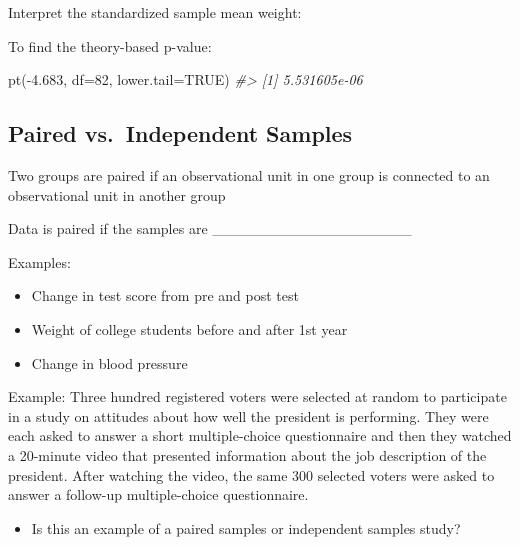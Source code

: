 \documentclass[
]{report}
\newenvironment{Shaded}{\begin{snugshade}}{\end{snugshade}}
\newcommand{\AttributeTok}[1]{\textcolor[rgb]{0.77,0.63,0.00}{#1}}
\newcommand{\CommentTok}[1]{\textcolor[rgb]{0.56,0.35,0.01}{\textit{#1}}}
\newcommand{\ConstantTok}[1]{\textcolor[rgb]{0.00,0.00,0.00}{#1}}
\newcommand{\DecValTok}[1]{\textcolor[rgb]{0.00,0.00,0.81}{#1}}
\newcommand{\FloatTok}[1]{\textcolor[rgb]{0.00,0.00,0.81}{#1}}
\newcommand{\FunctionTok}[1]{\textcolor[rgb]{0.00,0.00,0.00}{#1}}
\newcommand{\NormalTok}[1]{#1}
\newcommand{\SpecialCharTok}[1]{\textcolor[rgb]{0.00,0.00,0.00}{#1}}
\providecommand{\tightlist}{%
  \setlength{\itemsep}{0pt}\setlength{\parskip}{0pt}}
\newcommand{\rgi}{\hspace{24pt}}  %
\begin{document}
Interpret the standardized sample mean weight:

\vspace{0.8in}

To find the theory-based p-value:

\begin{Shaded}
\begin{Highlighting}[]
\FunctionTok{pt}\NormalTok{(}\SpecialCharTok{{-}}\FloatTok{4.683}\NormalTok{, }\AttributeTok{df=}\DecValTok{82}\NormalTok{, }\AttributeTok{lower.tail=}\ConstantTok{TRUE}\NormalTok{)}
\CommentTok{\#\textgreater{} [1] 5.531605e{-}06}
\end{Highlighting}
\end{Shaded}

\hypertarget{paired-vs.-independent-samples}{%
\subsection{Paired vs.~Independent Samples}\label{paired-vs.-independent-samples}}

Two groups are paired if an observational unit in one group is connected to an observational unit in another group

\rgi Data is paired if the samples are \_\_\_\_\_\_\_\_\_\_\_\_\_\_\_\_\_\_\_

Examples:

\begin{itemize}
\item
  Change in test score from pre and post test
\item
  Weight of college students before and after 1st year
\item
  Change in blood pressure
\end{itemize}

Example: Three hundred registered voters were selected at random to participate in a study on attitudes about how well the president is performing. They were each asked to answer a short multiple-choice questionnaire and then they watched a 20-minute video that presented information about the job description of the president. After watching the video, the same 300 selected voters were asked to answer a follow-up multiple-choice questionnaire.

\begin{itemize}
\tightlist
\item
  Is this an example of a paired samples or independent samples study?
\end{itemize}
\end{document}
